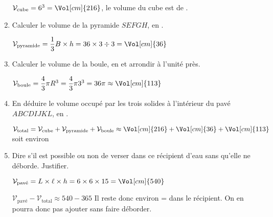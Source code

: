 \begin{corrige}
\begin{enumerate}
        {\color{red}$\mathcal{V}_{\text{cube}}=6^3=\Vol[cm]{216}$, le volume du cube est de .}
        \item Calculer le volume de la pyramide $SEFGH$, en \Vol[cm]{}.
        
        {\color{red}$\mathcal{V}_{\text{pyramide}}=\dfrac13 B\times h= 36\times 3 \div 3 = \Vol[cm]{36}$}
    \end{enumerate}
    \Coupe
    \begin{enumerate}
        \setcounter{enumi}{2}
        \item Calculer le volume de la boule, en \Vol[cm]{} et arrondir à l’unité près.
        
        {\color{red}$\mathcal{V}_{\text{boule}}=\dfrac43 \pi R^3=\dfrac43 \pi 3^3 = 36\pi\approx\Vol[cm]{113}$}
        \item En déduire le volume occupé par les trois  solides à l’intérieur du pavé $ABCDIJKL$, en \Vol[cm]{}.
        
        {\color{red}$\mathcal{V}_{\text{total}}=\mathcal{V}_{\text{cube}}+\mathcal{V}_{\text{pyramide}}+\mathcal{V}_{\text{boule}}\approx\Vol[cm]{216}+\Vol[cm]{36}+\Vol[cm]{113}$ soit environ }
        \item Dire s'il est possible ou non de verser dans ce récipient  d’eau sans qu’elle ne déborde. Justifier.

        {\color{red}$\mathcal{V}_{\text{pavé}}=L\times \ell \times h = 6\times 6\times 15 = \Vol[cm]{540}$
        
        $\mathcal{V}_{\text{pavé}}-\mathcal{V}_{\text{total}}\approx 540 -365$ Il reste donc environ = dans le récipient. On en pourra donc pas ajouter  sans faire déborder.
        }
    \end{enumerate}
\end{corrige}
